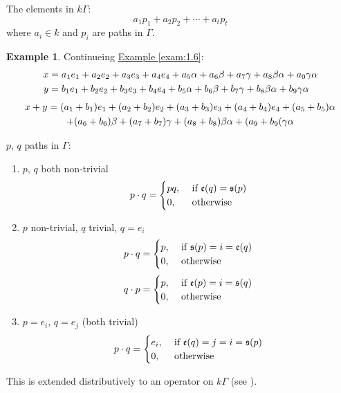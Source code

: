 \documentclass{amsart}
\numberwithin{equation}{section}
\theoremstyle{definition}
\newtheorem{exam}[thm]{Example}
\newcommand{\G}{\Gamma}
\begin{document}
The elements in $k\G$:
\[a_1p_1 + a_2p_2 + \cdots + a_tp_t\]
where $a_i\in k$ and $p_i$ are paths in $\G$.

\begin{exam}
Continueing \hyperref[exam:1.6]{Example \ref*{exam:1.6}}:
\begin{align}
x & = a_1e_1 + a_2e_2 + a_3e_3 + a_4e_4 + a_5\alpha + a_6\beta +
a_7\gamma + a_8\beta\alpha + a_9\gamma\alpha\notag\\
y & = b_1e_1 + b_2e_2 + b_3e_3 + b_4e_4 + b_5\alpha + b_6\beta +
b_7\gamma + b_8\beta\alpha + b_9\gamma\alpha\notag
\end{align}
\begin{multline}
x + y = (a_1 + b_1)e_1 + (a_2 + b_2)e_2 + (a_3 + b_3)e_3 + (a_4 +
b_4)e_4 + (a_5 + b_5)\alpha\notag\\ 
 + (a_6 + b_6)\beta + (a_7 + b_7)\gamma
+ (a_8 + b_8)\beta\alpha + (a_9 + b_9(\gamma\alpha\notag
\end{multline}
\end{exam}

$p$, $q$ paths in $\G$:
\begin{enumerate}[\rm(1)]
\item $p$, $q$ both non-trivial 
\[p\cdot q = \begin{cases} pq, & \text{\ if $\mathfrak{e}(q) =\mathfrak{s}(p)$}\notag\\
0, & \text{\ otherwise}\notag
\end{cases}\]
\item $p$ non-trivial, $q$ trivial, $q = e_i$
\[p\cdot q = \begin{cases} p, & \text{\ if $\mathfrak{s}(p) = i =\mathfrak{e}(q)$}\notag\\
0, & \text{\ otherwise}\notag
\end{cases}\]
\[q\cdot p = \begin{cases} p, & \text{\ if $\mathfrak{e}(p) = i = \mathfrak{s}(q)$}\notag\\
0, & \text{\ otherwise}\notag
\end{cases}\]
\item $p = e_i$, $q = e_j$ (both trivial)
\[p\cdot q = \begin{cases} e_i, & \text{\ if $\mathfrak{e}(q) = j = i
    = \mathfrak{s}(p)$}\notag\\
0, & \text{\ otherwise}\notag
\end{cases}\]
\end{enumerate}
 This is extended distributively to an operator on $k\G$ (see
 \cite[page 50]{ARS}).
\end{document}

